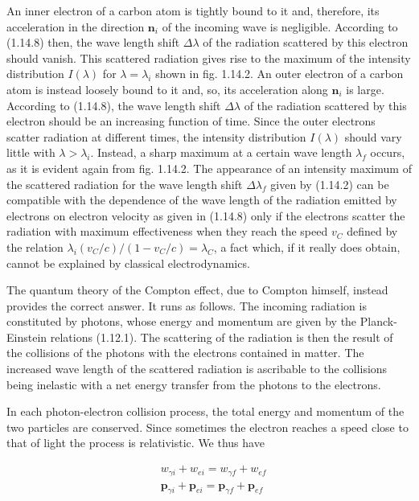 \documentclass{article}
\begin{document}
An inner electron of a carbon atom is tightly bound to it and, therefore, its acceleration in the direction $\boldsymbol{n}_{i}$ of the incoming wave is negligible. According to (1.14.8) then, the wave length shift $\Delta \lambda$ of the radiation scattered by this electron should vanish. This scattered radiation gives rise to the maximum of the intensity distribution $I(\lambda)$ for $\lambda=\lambda_{i}$ shown in fig. 1.14.2. An outer electron of a carbon atom is instead loosely bound to it and, so, its acceleration along $\boldsymbol{n}_{i}$ is large. According to (1.14.8), the wave length shift $\Delta \lambda$ of the radiation scattered by this electron should be an increasing function of time. Since the outer electrons
scatter radiation at different times, the intensity distribution $I(\lambda)$ should vary little with $\lambda>\lambda_{i}$. Instead, a sharp maximum at a certain wave length $\lambda_{f}$ occurs, as it is evident again from fig. 1.14.2. The appearance of an intensity maximum of the scattered radiation for the wave length shift $\Delta \lambda_{f}$ given by (1.14.2) can be compatible with the dependence of the wave length of the radiation emitted by electrons on electron velocity as given in (1.14.8) only if the electrons scatter the radiation with maximum effectiveness when they reach the speed $v_{C}$ defined by the relation $\lambda_{i}\left(v_{C} / c\right) /\left(1-v_{C} / c\right)=\lambda_{C}$, a fact which, if it really does obtain, cannot be explained by classical electrodynamics.

The quantum theory of the Compton effect, due to Compton himself, instead provides the correct answer. It runs as follows. The incoming radiation is constituted by photons, whose energy and momentum are given by the Planck-Einstein relations (1.12.1). The scattering of the radiation is then the result of the collisions of the photons with the electrons contained in matter. The increased wave length of the scattered radiation is ascribable to the collisions being inelastic with a net energy transfer from the photons to the electrons.

In each photon-electron collision process, the total energy and momentum of the two particles are conserved. Since sometimes the electron reaches a speed close to that of light the process is relativistic. We thus have
 
\begin{align*}
& w_{\gamma i}+w_{e i}=w_{\gamma f}+w_{e f}  \tag{1.14.9}\\
& \boldsymbol{p}_{\gamma i}+\boldsymbol{p}_{e i}=\boldsymbol{p}_{\gamma f}+\boldsymbol{p}_{e f} \tag{1.14.10}
\end{align*}
 
\end{document}
